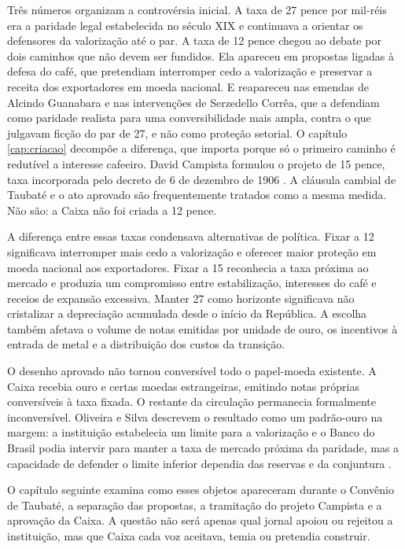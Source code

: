 Três números organizam a controvérsia inicial. A taxa de 27 pence por mil-réis era a paridade legal estabelecida no século XIX e continuava a orientar os defensores da valorização até o par. A taxa de 12 pence chegou ao debate por dois caminhos que não devem ser fundidos. Ela apareceu em propostas ligadas à defesa do café, que pretendiam interromper cedo a valorização e preservar a receita dos exportadores em moeda nacional. E reapareceu nas emendas de Alcindo Guanabara e nas intervenções de Serzedello Corrêa, que a defendiam como paridade realista para uma conversibilidade mais ampla, contra o que julgavam ficção do par de 27, e não como proteção setorial. O capítulo \ref{cap:criacao} decompõe a diferença, que importa porque só o primeiro caminho é redutível a interesse cafeeiro. David Campista formulou o projeto de 15 pence, taxa incorporada pelo decreto de 6 de dezembro de 1906 \cite{torelli2004,brasil1906caixa}. A cláusula cambial de Taubaté e o ato aprovado são frequentemente tratados como a mesma medida. Não são: a Caixa não foi criada a 12 pence.

A diferença entre essas taxas condensava alternativas de política. Fixar a 12 significava interromper mais cedo a valorização e oferecer maior proteção em moeda nacional aos exportadores. Fixar a 15 reconhecia a taxa próxima ao mercado e produzia um compromisso entre estabilização, interesses do café e receios de expansão excessiva. Manter 27 como horizonte significava não cristalizar a depreciação acumulada desde o início da República. A escolha também afetava o volume de notas emitidas por unidade de ouro, os incentivos à entrada de metal e a distribuição dos custos da transição.

O desenho aprovado não tornou conversível todo o papel-moeda existente. A Caixa recebia ouro e certas moedas estrangeiras, emitindo notas próprias conversíveis à taxa fixada. O restante da circulação permanecia formalmente inconversível. Oliveira e Silva descrevem o resultado como um padrão-ouro na margem: a instituição estabelecia um limite para a valorização e o Banco do Brasil podia intervir para manter a taxa de mercado próxima da paridade, mas a capacidade de defender o limite inferior dependia das reservas e da conjuntura \cite{oliveirasilva2001}.


O capítulo seguinte examina como esses objetos apareceram durante o Convênio de Taubaté, a separação das propostas, a tramitação do projeto Campista e a aprovação da Caixa. A questão não será apenas qual jornal apoiou ou rejeitou a instituição, mas que Caixa cada voz aceitava, temia ou pretendia construir.
